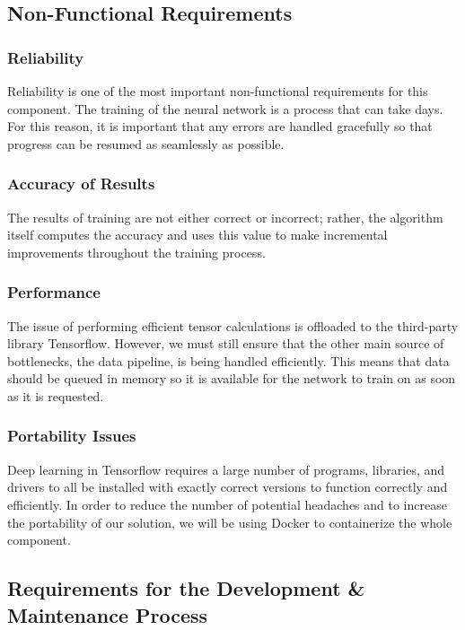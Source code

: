\documentclass[12pt]{article}
\begin{document}
\subsection{Non-Functional Requirements}

\subsubsection {Reliability}

Reliability is one of the most important non-functional requirements for this component. The training of the neural network is a process that can take days. For this reason, it is important that any errors are handled gracefully so that progress can be resumed as seamlessly as possible.

\subsubsection {Accuracy of Results}
 
The results of training are not either correct or incorrect; rather, the algorithm itself computes the accuracy and uses this value to make incremental improvements throughout the training process.

\subsubsection {Performance}

The issue of performing efficient tensor calculations is offloaded to the third-party library Tensorflow. However, we must still ensure that the other main source of bottlenecks, the data pipeline, is being handled efficiently. This means that data should be queued in memory so it is available for the network to train on as soon as it is requested.

\subsubsection {Portability Issues}

Deep learning in Tensorflow requires a large number of programs, libraries, and drivers to all be installed with exactly correct versions to function correctly and efficiently. In order to reduce the number of potential headaches and to increase the portability of our solution, we will be using Docker to containerize the whole component.

\subsection{Requirements for the Development \& Maintenance Process}
\end{document}
